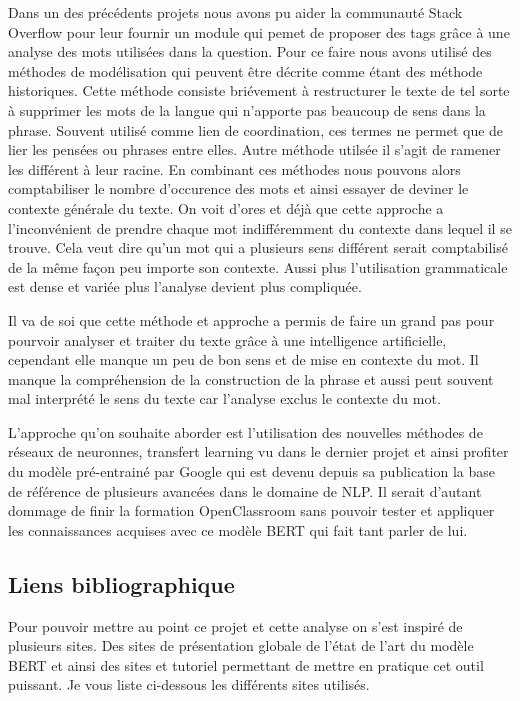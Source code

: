 \documentclass[8pt]{article}
\begin{document}
    Dans un des précédents projets nous avons pu aider la communauté Stack
Overflow pour leur fournir un module qui pemet de proposer des tags
grâce à une analyse des mots utilisées dans la question. Pour ce faire
nous avons utilisé des méthodes de modélisation qui peuvent être décrite
comme étant des méthode historiques. Cette méthode consiste briévement à
restructurer le texte de tel sorte à supprimer les mots de la langue qui
n'apporte pas beaucoup de sens dans la phrase. Souvent utilisé comme
lien de coordination, ces termes ne permet que de lier les pensées ou
phrases entre elles. Autre méthode utilsée il s'agit de ramener les
différent à leur racine. En combinant ces méthodes nous pouvons alors
comptabiliser le nombre d'occurence des mots et ainsi essayer de deviner
le contexte générale du texte. On voit d'ores et déjà que cette approche
a l'inconvénient de prendre chaque mot indifféremment du contexte dans
lequel il se trouve. Cela veut dire qu'un mot qui a plusieurs sens
différent serait comptabilisé de la même façon peu importe son contexte.
Aussi plus l'utilisation grammaticale est dense et variée plus l'analyse
devient plus compliquée.

    Il va de soi que cette méthode et approche a permis de faire un grand
pas pour pourvoir analyser et traiter du texte grâce à une intelligence
artificielle, cependant elle manque un peu de bon sens et de mise en
contexte du mot. Il manque la compréhension de la construction de la
phrase et aussi peut souvent mal interprété le sens du texte car
l'analyse exclus le contexte du mot.

    L'approche qu'on souhaite aborder est l'utilisation des nouvelles
méthodes de réseaux de neuronnes, transfert learning vu dans le dernier
projet et ainsi profiter du modèle pré-entrainé par Google qui est
devenu depuis sa publication la base de référence de plusieurs avancées
dans le domaine de NLP. Il serait d'autant dommage de finir la formation
OpenClassroom sans pouvoir tester et appliquer les connaissances
acquises avec ce modèle BERT qui fait tant parler de lui.

    \hypertarget{liens-bibliographique}{%
\subsection{Liens bibliographique}\label{liens-bibliographique}}

    Pour pouvoir mettre au point ce projet et cette analyse on s'est inspiré
de plusieurs sites. Des sites de présentation globale de l'état de l'art
du modèle BERT et ainsi des sites et tutoriel permettant de mettre en
pratique cet outil puissant. Je vous liste ci-dessous les différents
sites utilisés. 
\end{document}
